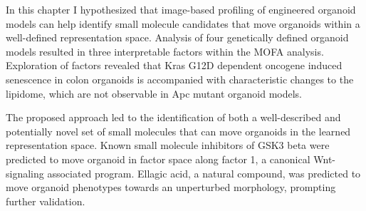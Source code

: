 \begin{flushleft}
\bigbreak
In this chapter I hypothesized that image-based profiling of engineered organoid models can help identify small molecule candidates that move organoids within a well-defined representation space. Analysis of four genetically defined organoid models resulted in three interpretable factors within the MOFA analysis. Exploration of factors revealed that Kras G12D dependent oncogene induced senescence in colon organoids is accompanied with characteristic changes to the lipidome, which are not observable in Apc mutant organoid models. 

\bigbreak
The proposed approach led to the identification of both a well-described and potentially novel set of small molecules that can move organoids in the learned representation space. Known small molecule inhibitors of GSK3 beta were predicted to move organoid in factor space along factor 1, a canonical Wnt-signaling associated program. Ellagic acid, a natural compound, was predicted to move organoid phenotypes towards an unperturbed morphology, prompting further validation. 
\end{flushleft}